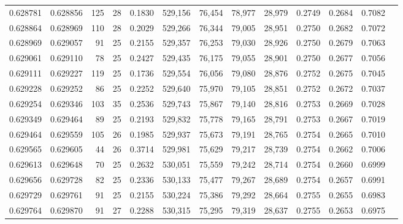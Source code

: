 \begin{tabular}{rrrrrrrrrrrrr}
0.628781 & 0.628856 & 125 &  28 &                                     0.1830 & 529,156 &  76,454 &  78,977 &  28,979 & 0.2749 & 0.2684 & 0.7082 \\
0.628864 & 0.628969 & 110 &  28 &                                     0.2029 & 529,266 &  76,344 &  79,005 &  28,951 & 0.2750 & 0.2682 & 0.7072 \\
0.628969 & 0.629057 &  91 &  25 &                                     0.2155 & 529,357 &  76,253 &  79,030 &  28,926 & 0.2750 & 0.2679 & 0.7063 \\
0.629061 & 0.629110 &  78 &  25 &                                     0.2427 & 529,435 &  76,175 &  79,055 &  28,901 & 0.2750 & 0.2677 & 0.7056 \\
0.629111 & 0.629227 & 119 &  25 &                                     0.1736 & 529,554 &  76,056 &  79,080 &  28,876 & 0.2752 & 0.2675 & 0.7045 \\
0.629228 & 0.629252 &  86 &  25 &                                     0.2252 & 529,640 &  75,970 &  79,105 &  28,851 & 0.2752 & 0.2672 & 0.7037 \\
0.629254 & 0.629346 & 103 &  35 &                                     0.2536 & 529,743 &  75,867 &  79,140 &  28,816 & 0.2753 & 0.2669 & 0.7028 \\
0.629349 & 0.629464 &  89 &  25 &                                     0.2193 & 529,832 &  75,778 &  79,165 &  28,791 & 0.2753 & 0.2667 & 0.7019 \\
0.629464 & 0.629559 & 105 &  26 &                                     0.1985 & 529,937 &  75,673 &  79,191 &  28,765 & 0.2754 & 0.2665 & 0.7010 \\
0.629565 & 0.629605 &  44 &  26 &                                     0.3714 & 529,981 &  75,629 &  79,217 &  28,739 & 0.2754 & 0.2662 & 0.7006 \\
0.629613 & 0.629648 &  70 &  25 &                                     0.2632 & 530,051 &  75,559 &  79,242 &  28,714 & 0.2754 & 0.2660 & 0.6999 \\
0.629656 & 0.629728 &  82 &  25 &                                     0.2336 & 530,133 &  75,477 &  79,267 &  28,689 & 0.2754 & 0.2657 & 0.6991 \\
0.629729 & 0.629761 &  91 &  25 &                                     0.2155 & 530,224 &  75,386 &  79,292 &  28,664 & 0.2755 & 0.2655 & 0.6983 \\
0.629764 & 0.629870 &  91 &  27 &                                     0.2288 & 530,315 &  75,295 &  79,319 &  28,637 & 0.2755 & 0.2653 & 0.6975 \\

\end{tabular}
